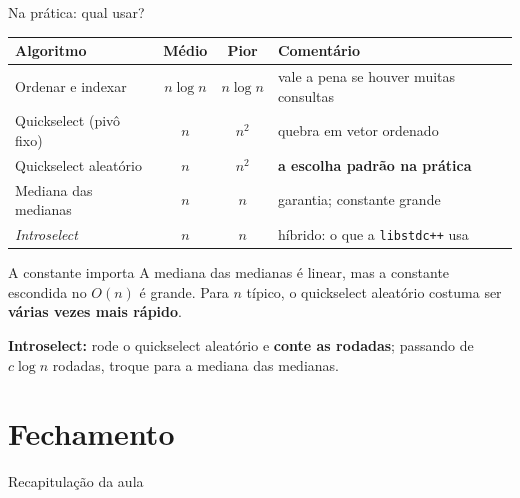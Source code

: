 \documentclass[aspectratio=169]{beamer}
\begin{document}
\begin{frame}{Na prática: qual usar?}
  \begin{center}
  \small
  \begin{tabular}{lccl}
    \toprule
    \textbf{Algoritmo} & \textbf{Médio} & \textbf{Pior} & \textbf{Comentário}\\
    \midrule
    Ordenar e indexar & $n\log n$ & $n\log n$ & vale a pena se houver muitas consultas\\
    Quickselect (pivô fixo) & $n$ & $n^2$ & quebra em vetor ordenado\\
    Quickselect aleatório & $n$ & $n^2$ & \textbf{a escolha padrão na prática}\\
    Mediana das medianas & $n$ & $n$ & garantia; constante grande\\
    \emph{Introselect} & $n$ & $n$ & híbrido: o que a \texttt{libstdc++} usa\\
    \bottomrule
  \end{tabular}
  \end{center}

  \begin{block}{A constante importa}
    A mediana das medianas é linear, mas a constante escondida no $O(n)$ é
    grande. Para $n$ típico, o quickselect aleatório costuma ser
    \textbf{várias vezes mais rápido}.
  \end{block}

  \textbf{Introselect:} rode o quickselect aleatório e \textbf{conte as
  rodadas}; passando de $c\log n$ rodadas, troque para a mediana das medianas.
\end{frame}

\section*{Fechamento}

\begin{frame}{Recapitulação da aula}
  \begin{center}
  \end{center}
\end{frame}
\end{document}
